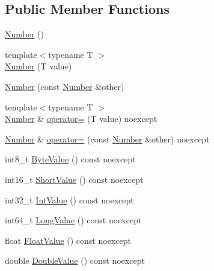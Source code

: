 \subsection*{Public Member Functions}
\begin{DoxyCompactItemize}
\item 
\mbox{\hyperlink{classlucene_1_1core_1_1util_1_1numeric_1_1Number_a6f7d606df5780fb44022a297469cf301}{Number}} ()
\item 
{\footnotesize template$<$typename T $>$ }\\\mbox{\hyperlink{classlucene_1_1core_1_1util_1_1numeric_1_1Number_a882d32da42457953ff689a78b6cfc06c}{Number}} (T value)
\item 
\mbox{\hyperlink{classlucene_1_1core_1_1util_1_1numeric_1_1Number_a20fd702a77592e0f37f83203882663ff}{Number}} (const \mbox{\hyperlink{classlucene_1_1core_1_1util_1_1numeric_1_1Number}{Number}} \&other)
\item 
{\footnotesize template$<$typename T $>$ }\\\mbox{\hyperlink{classlucene_1_1core_1_1util_1_1numeric_1_1Number}{Number}} \& \mbox{\hyperlink{classlucene_1_1core_1_1util_1_1numeric_1_1Number_a9267cd182581260141c7bb35e431d083}{operator=}} (T value) noexcept
\item 
\mbox{\hyperlink{classlucene_1_1core_1_1util_1_1numeric_1_1Number}{Number}} \& \mbox{\hyperlink{classlucene_1_1core_1_1util_1_1numeric_1_1Number_a263e7f66bce840ef32738bff48db4a71}{operator=}} (const \mbox{\hyperlink{classlucene_1_1core_1_1util_1_1numeric_1_1Number}{Number}} \&other) noexcept
\item 
int8\+\_\+t \mbox{\hyperlink{classlucene_1_1core_1_1util_1_1numeric_1_1Number_a0d359a6cf3b7f7f61f669f84411708a8}{Byte\+Value}} () const noexcept
\item 
int16\+\_\+t \mbox{\hyperlink{classlucene_1_1core_1_1util_1_1numeric_1_1Number_a752109e10e001b12fb520334401bfa76}{Short\+Value}} () const noexcept
\item 
int32\+\_\+t \mbox{\hyperlink{classlucene_1_1core_1_1util_1_1numeric_1_1Number_afeb2bcbe0798e196578cff1f5946f45b}{Int\+Value}} () const noexcept
\item 
int64\+\_\+t \mbox{\hyperlink{classlucene_1_1core_1_1util_1_1numeric_1_1Number_ad37926a2bf4e84279ab97f584b1807d7}{Long\+Value}} () const noexcept
\item 
float \mbox{\hyperlink{classlucene_1_1core_1_1util_1_1numeric_1_1Number_a757b8a62184cf1d85ee774fffdc380de}{Float\+Value}} () const noexcept
\item 
double \mbox{\hyperlink{classlucene_1_1core_1_1util_1_1numeric_1_1Number_aa1ad1e93dddf1c59440ea49f39b510f1}{Double\+Value}} () const noexcept
\end{DoxyCompactItemize}
